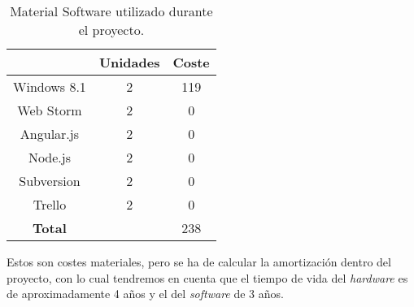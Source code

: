 \begin{table}[h]
\begin{center}
\begin{tabular}{ccc}
\hline
\rowcolor[HTML]{C0C0C0} 
\multicolumn{1}{|c|}{\cellcolor[HTML]{C0C0C0}\textbf{Software}} & \multicolumn{1}{c|}{\cellcolor[HTML]{C0C0C0}\textbf{Unidades}} & \multicolumn{1}{c|}{\cellcolor[HTML]{C0C0C0}\textbf{Coste}} \\ \hline
\multicolumn{1}{|c|}{Windows 8.1}                               & \multicolumn{1}{c|}{2}                                         & \multicolumn{1}{c|}{119}                                    \\ \hline
\multicolumn{1}{|c|}{Web Storm}                            & \multicolumn{1}{c|}{2}                                         & \multicolumn{1}{c|}{0}                                      \\ \hline
\multicolumn{1}{|c|}{Angular.js}                                & \multicolumn{1}{c|}{2}                                         & \multicolumn{1}{c|}{0}                                      \\ \hline
\multicolumn{1}{|c|}{Node.js}                                   & \multicolumn{1}{c|}{2}                                         & \multicolumn{1}{c|}{0}                                      \\ \hline
\multicolumn{1}{|c|}{Subversion}                                   & \multicolumn{1}{c|}{2}                                         & \multicolumn{1}{c|}{0}                                      \\ \hline
\multicolumn{1}{|c|}{Trello}                                   & \multicolumn{1}{c|}{2}                                         & \multicolumn{1}{c|}{0}                                      \\ \hline
\rowcolor[HTML]{656565} 
{\color[HTML]{FFFFFF} \textbf{Total}}                           & {\color[HTML]{FFFFFF} }                                        & {\color[HTML]{FFFFFF} 238}                                 
\end{tabular}
\end{center}
\caption{Material Software utilizado durante el proyecto. \label{tab:costSoftware}}
\end{table}

Estos son costes materiales, pero se ha de calcular la amortización dentro del proyecto, con lo cual tendremos en cuenta que el tiempo de vida del \textit{hardware} es de aproximadamente 4 años y el del \textit{software} de 3 años.

